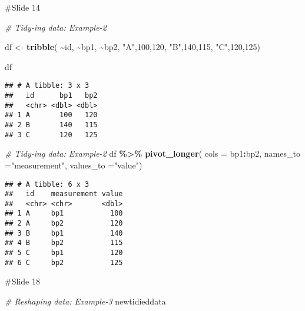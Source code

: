 \documentclass[
]{article}
\newenvironment{Shaded}{\begin{snugshade}}{\end{snugshade}}
\newcommand{\AttributeTok}[1]{\textcolor[rgb]{0.13,0.29,0.53}{#1}}
\newcommand{\CommentTok}[1]{\textcolor[rgb]{0.56,0.35,0.01}{\textit{#1}}}
\newcommand{\DecValTok}[1]{\textcolor[rgb]{0.00,0.00,0.81}{#1}}
\newcommand{\FunctionTok}[1]{\textcolor[rgb]{0.13,0.29,0.53}{\textbf{#1}}}
\newcommand{\NormalTok}[1]{#1}
\newcommand{\OtherTok}[1]{\textcolor[rgb]{0.56,0.35,0.01}{#1}}
\newcommand{\SpecialCharTok}[1]{\textcolor[rgb]{0.81,0.36,0.00}{\textbf{#1}}}
\newcommand{\StringTok}[1]{\textcolor[rgb]{0.31,0.60,0.02}{#1}}
\begin{document}
\#Slide 14

\begin{Shaded}
\begin{Highlighting}[]
\CommentTok{\# Tidy{-}ing data: Example{-}2}

\NormalTok{df }\OtherTok{\textless{}{-}} \FunctionTok{tribble}\NormalTok{(}
  \SpecialCharTok{\textasciitilde{}}\NormalTok{id, }\SpecialCharTok{\textasciitilde{}}\NormalTok{bp1, }\SpecialCharTok{\textasciitilde{}}\NormalTok{bp2,}
  \StringTok{"A"}\NormalTok{,}\DecValTok{100}\NormalTok{,}\DecValTok{120}\NormalTok{,}
  \StringTok{"B"}\NormalTok{,}\DecValTok{140}\NormalTok{,}\DecValTok{115}\NormalTok{,}
  \StringTok{"C"}\NormalTok{,}\DecValTok{120}\NormalTok{,}\DecValTok{125}\NormalTok{)}

\NormalTok{df}
\end{Highlighting}
\end{Shaded}

\begin{verbatim}
## # A tibble: 3 x 3
##   id      bp1   bp2
##   <chr> <dbl> <dbl>
## 1 A       100   120
## 2 B       140   115
## 3 C       120   125
\end{verbatim}

\begin{Shaded}
\begin{Highlighting}[]
\CommentTok{\# Tidy{-}ing data: Example{-}2}
\NormalTok{df }\SpecialCharTok{\%\textgreater{}\%}
  \FunctionTok{pivot\_longer}\NormalTok{(}
    \AttributeTok{cols =}\NormalTok{ bp1}\SpecialCharTok{:}\NormalTok{bp2,}
    \AttributeTok{names\_to =}\StringTok{"measurement"}\NormalTok{,}
    \AttributeTok{values\_to =}\StringTok{"value"}\NormalTok{)}
\end{Highlighting}
\end{Shaded}

\begin{verbatim}
## # A tibble: 6 x 3
##   id    measurement value
##   <chr> <chr>       <dbl>
## 1 A     bp1           100
## 2 A     bp2           120
## 3 B     bp1           140
## 4 B     bp2           115
## 5 C     bp1           120
## 6 C     bp2           125
\end{verbatim}

\#Slide 18

\begin{Shaded}
\begin{Highlighting}[]
\CommentTok{\# Reshaping data: Example{-}3}
\NormalTok{newtidieddata}
\end{Highlighting}
\end{Shaded}
\end{document}
